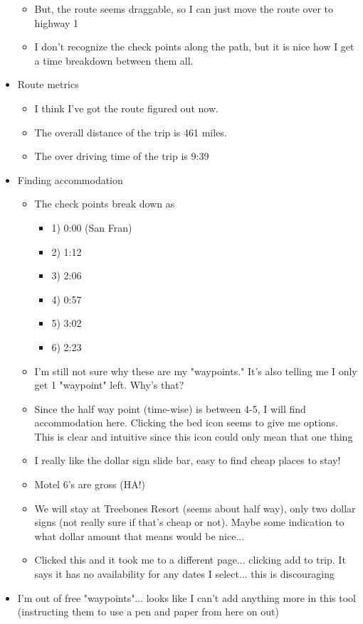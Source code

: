 \begin{itemize}
\begin{itemize}
  \item But, the route seems draggable, so I can just move the route over to highway 1
  \item I don't recognize the check points along the path, but it is nice how I get a time breakdown between them all.
  \end{itemize}
\item Route metrics
  \begin{itemize}
  \item I think I've got the route figured out now.
  \item The overall distance of the trip is 461 miles.
  \item The over driving time of the trip is 9:39
  \end{itemize}
\item Finding accommodation
  \begin{itemize}
  \item The check points break down as
    \begin{itemize}
    \item 1) 0:00 (San Fran)
    \item 2) 1:12
    \item 3) 2:06
    \item 4) 0:57
    \item 5) 3:02
    \item 6) 2:23
    \end{itemize}
  \item I'm still not sure why these are my "waypoints." It's also telling me I only get 1 "waypoint" left. Why's that?
  \item Since the half way point (time-wise) is between 4-5, I will find accommodation here. Clicking the bed icon seems to give me options. This is clear and intuitive since this icon could only mean that one thing
  \item I really like the dollar sign slide bar, easy to find cheap places to stay!
  \item Motel 6's are gross (HA!)
  \item We will stay at Treebones Resort (seems about half way), only two dollar signs (not really sure if that's cheap or not). Maybe some indication to what dollar amount that means would be nice...
  \item Clicked this and it took me to a different page... clicking add to trip. It says it has no availability for any dates I select... this is discouraging
  \end{itemize}
\item I'm out of free "waypoints"... looks like I can't add anything more in this tool (instructing them to use a pen and paper from here on out)

\end{itemize}
